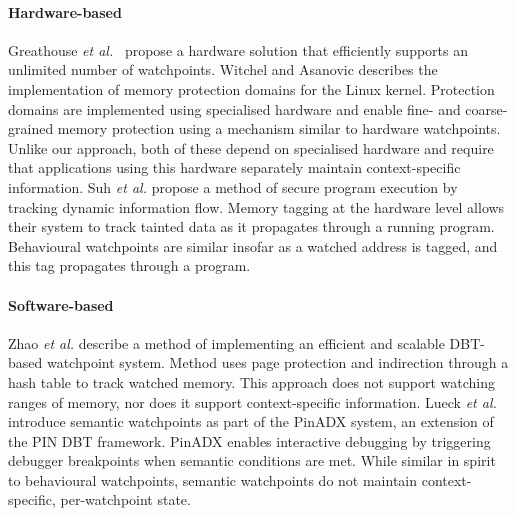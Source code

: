 \documentclass[letterpaper,twocolumn,10pt]{article}
\begin{document}
\paragraph{Hardware-based}
Greathouse \emph{et al.}~\cite{UnlimitedWatchpoints} propose a hardware solution that efficiently supports an unlimited number of watchpoints. Witchel and Asanovic \cite{Mondrix} describes the implementation of memory protection domains for the Linux kernel. Protection domains are implemented using specialised hardware and enable fine- and coarse-grained memory protection using a mechanism similar to hardware watchpoints. Unlike our approach, both of these depend on specialised hardware and require that applications using this hardware  separately maintain context-specific information. Suh \emph{et al.} \cite{SecureProgramExecFlowTracking} propose a method of secure program execution by tracking dynamic information flow. Memory tagging at the hardware level allows their system to track tainted data as it propagates through a running program. Behavioural watchpoints are similar insofar as a watched address is tagged, and this tag propagates through a program.




\paragraph{Software-based}
Zhao \emph{et al.} \cite{DynamoRIOWatchpoints} describe a method of implementing an efficient and scalable DBT-based watchpoint system. Method uses page protection and indirection through a hash table to track watched memory. This approach does not support watching ranges of memory, nor does it support context-specific information. Lueck \emph{et al.} \cite{PinADX} introduce semantic watchpoints as part of the PinADX system, an extension of the PIN DBT framework. PinADX enables interactive debugging by triggering debugger breakpoints when semantic conditions are met. While similar in spirit to behavioural watchpoints, semantic watchpoints do not maintain context-specific, per-watchpoint state. 
\end{document}
